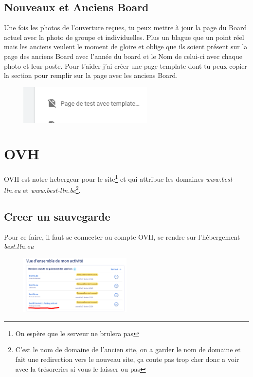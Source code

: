 \documentclass[12pt]{article}
\begin{document}
	\subsection{Nouveaux et Anciens Board}
	Une fois les photos de l'ouverture reçues, tu peux mettre à jour la page du Board actuel avec la photo de groupe et individuelles.
	Plus un blague que un point réel mais les anciens veulent le moment de gloire et oblige que ils soient présent sur la page des anciens Board avec l'année du board et le Nom de celui-ci avec chaque photo et leur poste.
	Pour t'aider j'ai créer une page template dont tu peux copier la section pour remplir sur la page avec les anciens Board.
	\begin{figure}[htp]
		\centering
		\includegraphics[width=0.6\textwidth]{img/TemplateBoard.png}
	\end{figure} 
	
	
\section{OVH}
	OVH est notre hebergeur pour le site\footnote{On espère que le serveur ne brulera pas} et qui attribue les domaines \textit{www.best-lln.eu} et \textit{www.best-lln.be}\footnote{C'est le nom de domaine de l'ancien site, on a garder le nom de domaine et fait une redirection vers le nouveau site, ça coute pas trop cher donc a voir avec la trésoreries si vous le laisser ou pas}. 
	\subsection{Creer un sauvegarde}
	\label{creersauvegarde}
		Pour ce faire, il faut se connecter au compte OVH, se rendre sur l'hébergement \textit{best.lln.eu}
		
		\begin{figure}[htp]
			\centering
			\includegraphics[width=0.5\textwidth]{img/OVH.png}
		\end{figure}
		
\end{document}
